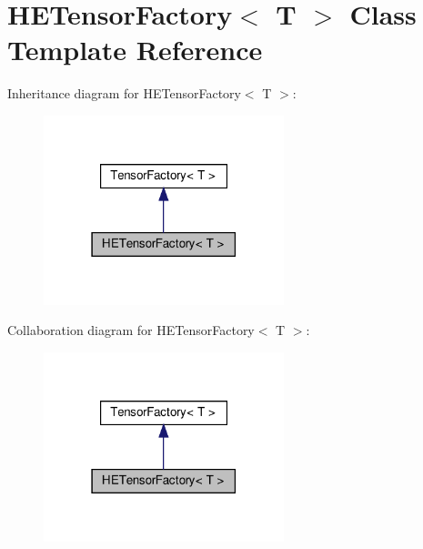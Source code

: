 \hypertarget{classHETensorFactory}{}\section{H\+E\+Tensor\+Factory$<$ T $>$ Class Template Reference}
\label{classHETensorFactory}


Inheritance diagram for H\+E\+Tensor\+Factory$<$ T $>$\+:
\nopagebreak
\begin{figure}[H]
\begin{center}
\leavevmode
\includegraphics[width=198pt]{classHETensorFactory__inherit__graph}
\end{center}
\end{figure}


Collaboration diagram for H\+E\+Tensor\+Factory$<$ T $>$\+:
\nopagebreak
\begin{figure}[H]
\begin{center}
\leavevmode
\includegraphics[width=198pt]{classHETensorFactory__coll__graph}
\end{center}
\end{figure}
